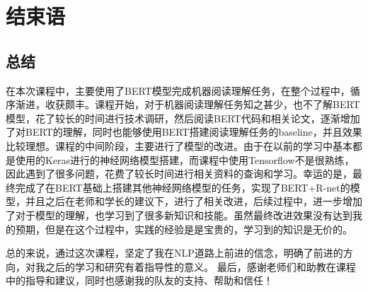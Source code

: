 \documentclass[10pt, a4]{extarticle}
\begin{document}
\section{结束语}
\subsection{总结}
在本次课程中，主要使用了BERT模型完成机器阅读理解任务，在整个过程中，循序渐进，收获颇丰。课程开始，对于机器阅读理解任务知之甚少，也不了解BERT模型，花了较长的时间进行技术调研，然后阅读BERT代码和相关论文，逐渐增加了对BERT的理解，同时也能够使用BERT搭建阅读理解任务的baseline，并且效果比较理想。课程的中间阶段，主要进行了模型的改进。由于在以前的学习中基本都是使用的Keras进行的神经网络模型搭建，而课程中使用Tensorflow不是很熟练，因此遇到了很多问题，花费了较长时间进行相关资料的查询和学习。幸运的是，最终完成了在BERT基础上搭建其他神经网络模型的任务，实现了BERT+R-net的模型，并且之后在老师和学长的建议下，进行了相关改进，后续过程中，进一步增加了对于模型的理解，也学习到了很多新知识和技能。虽然最终改进效果没有达到我的预期，但是在这个过程中，实践的经验是是宝贵的，学习到的知识是无价的。

总的来说，通过这次课程，坚定了我在NLP道路上前进的信念，明确了前进的方向，对我之后的学习和研究有着指导性的意义。
最后，感谢老师们和助教在课程中的指导和建议，同时也感谢我的队友的支持、帮助和信任！
\end{document}
